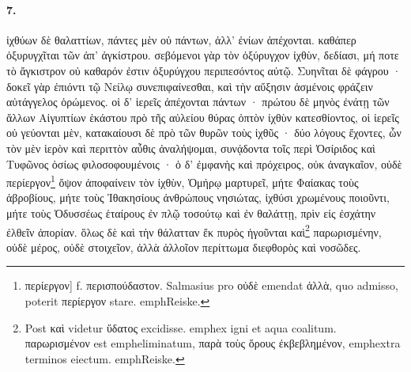 \documentclass[a4paper, 11pt, oneside, polutonikogreek, german]{article}
\begin{document}
\paragraph{7.}
ἰχθύων δὲ θαλαττίων, πάντες μὲν οὐ πάντων, ἀλλ' ἐνίων ἀπέχονται. καθάπερ ὀξυρυγχῖται τῶν ἀπ' ἀγκίστρου. σεβόμενοι γὰρ τὸν ὀξύρυγχον ἰχθὺν, δεδίασι, μή ποτε τὸ ἄγκιστρον οὐ καθαρόν ἐστιν ὀξυρύγχου περιπεσόντος αὐτῷ. Συηνῖται δὲ φάγρου · δοκεῖ γὰρ ἐπιόντι τῷ Νείλῳ συνεπιφαίνεσθαι, καὶ τὴν αὔξησιν ἀσμένοις φράζειν αὐτάγγελος ὁρώμενος. οἱ δ' ἱερεῖς ἀπέχονται πάντων · πρώτου δὲ μηνὸς ἐνάτῃ τῶν ἄλλων Αἰγυπτίων ἑκάστου πρὸ τῆς αὐλείου θύρας ὀπτὸν ἰχθὺν κατεσθίοντος, οἱ ἱερεῖς οὐ γεύονται μὲν, κατακαίουσι δὲ πρὸ τῶν θυρῶν τοὺς ἰχθῦς · δύο λόγους ἔχοντες, ὧν τὸν μὲν ἱερὸν καὶ περιττὸν αὖθις ἀναλήψομαι, συνᾴδοντα τοῖς περὶ Ὀσίριδος καὶ Τυφῶνος ὁσίως φιλοσοφουμένοις · ὁ δ' ἐμφανὴς καὶ πρόχειρος, οὐκ ἀναγκαῖον, οὐδὲ περίεργον\footnote{περίεργον] f. περισπούδαστον. Salmasius pro οὐδὲ emendat ἀλλὰ, quo admisso, poterit περίεργον stare. emph{Reiske.}} ὄψον ἀποφαίνειν τὸν ἰχθὺν, Ὁμήρῳ μαρτυρεῖ, μήτε Φαίακας τοὺς ἁβροβίους, μήτε τοὺς Ἰθακησίους ἀνθρώπους νησιώτας, ἰχθύσι χρωμένους ποιοῦντι, μήτε τοὺς Ὀδυσσέως ἑταίρους ἐν πλῷ τοσούτῳ καὶ ἐν θαλάττῃ, πρὶν εἰς ἐσχάτην ἐλθεῖν ἀπορίαν. ὅλως δὲ καὶ τὴν θάλατταν ἔκ πυρὸς ἡγοῦνται καὶ\footnote{Post καὶ videtur ὕδατος excidisse. emph{ex igni et aqua coalitum.} παρωρισμένον est emph{eliminatum}, παρὰ τοὺς ὅρους ἐκβεβλημένον, emph{extra terminos eiectum.} emph{Reiske.}} παρωρισμένην, οὐδὲ μέρος, οὐδὲ στοιχεῖον, ἀλλὰ ἀλλοῖον περίττωμα διεφθορὸς καὶ νοσῶδες.
\end{document}
